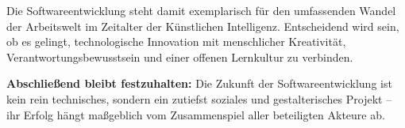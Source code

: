 Die Softwareentwicklung steht damit exemplarisch für den umfassenden Wandel der
Arbeitswelt im Zeitalter der Künstlichen Intelligenz. Entscheidend wird sein,
ob es gelingt, technologische Innovation mit menschlicher Kreativität,
Verantwortungsbewusstsein und einer offenen Lernkultur zu verbinden.

\textbf{Abschließend bleibt festzuhalten:} Die Zukunft der Softwareentwicklung ist kein rein technisches, sondern ein zutiefst soziales und gestalterisches Projekt – ihr Erfolg hängt maßgeblich vom Zusammenspiel aller beteiligten Akteure ab.

% 

% 

% 